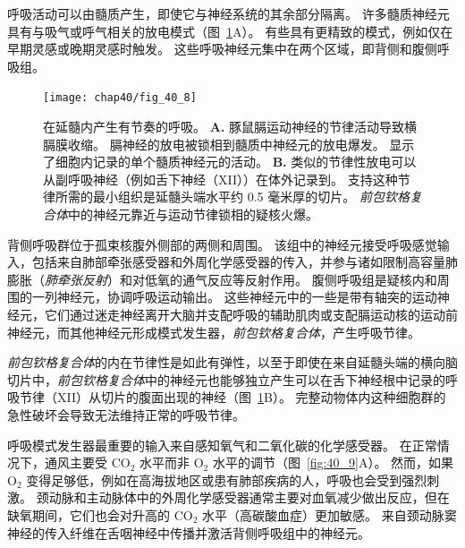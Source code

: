 呼吸活动可以由髓质产生，即使它与神经系统的其余部分隔离。
许多髓质神经元具有与吸气或呼气相关的放电模式（图~\ref{fig:40_8}A）。
有些具有更精致的模式，例如仅在早期灵感或晚期灵感时触发。
这些呼吸神经元集中在两个区域，即背侧和腹侧呼吸组。


\begin{figure}[htbp]
	\centering
	\texttt{[image: chap40/fig\_40\_8]}
	\caption{在延髓内产生有节奏的呼吸。 
		\textbf{A.} 豚鼠膈运动神经的节律活动导致横膈膜收缩。
		膈神经的放电被锁相到髓质中神经元的放电爆发。
		显示了细胞内记录的单个髓质神经元的活动\cite{richerson1987maintenance}。
		\textbf{B.} 类似的节律性放电可以从副呼吸神经（例如舌下神经（XII））在体外记录到。
		支持这种节律所需的最小组织是延髓头端水平约 0.5 毫米厚的切片。
		\textit{前包钦格复合体}中的神经元靠近与运动节律锁相的疑核火爆\cite{smith1991pre}。}
	\label{fig:40_8}
\end{figure}


背侧呼吸群位于孤束核腹外侧部的两侧和周围。
该组中的神经元接受呼吸感觉输入，包括来自肺部牵张感受器和外周化学感受器的传入，并参与诸如限制高容量肺膨胀（\textit{肺牵张反射}）和对低氧的通气反应等反射作用。
腹侧呼吸组是疑核内和周围的一列神经元，协调呼吸运动输出。
这些神经元中的一些是带有轴突的运动神经元，它们通过迷走神经离开大脑并支配呼吸的辅助肌肉或支配膈运动核的运动前神经元，而其他神经元形成模式发生器，\textit{前包钦格复合体}，产生呼吸节律。


\textit{前包钦格复合体}的内在节律性是如此有弹性，以至于即使在来自延髓头端的横向脑切片中，\textit{前包钦格复合体}中的神经元也能够独立产生可以在舌下神经根中记录的呼吸节律（XII）从切片的腹面出现的神经（图~\ref{fig:40_8}B）。
完整动物体内这种细胞群的急性破坏会导致无法维持正常的呼吸节律。


呼吸模式发生器最重要的输入来自感知氧气和二氧化碳的化学感受器。
在正常情况下，通风主要受 CO$_2$ 水平而非 O$_2$ 水平的调节（图~\ref{fig:40_9}A）。
然而，如果 O$_2$ 变得足够低，例如在高海拔地区或患有肺部疾病的人，呼吸也会受到强烈刺激。
颈动脉和主动脉体中的外周化学感受器通常主要对血氧减少做出反应，但在缺氧期间，它们也会对升高的 CO$_2$ 水平（高碳酸血症）更加敏感。
来自颈动脉窦神经的传入纤维在舌咽神经中传播并激活背侧呼吸组中的神经元。


